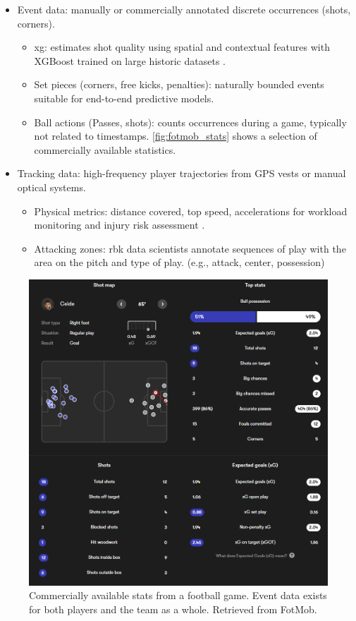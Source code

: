 \begin{itemize}
    \item Event data: manually or commercially annotated discrete occurrences (shots, corners).
    \begin{itemize}
        \item \acrfull{xg}: estimates shot quality using spatial and contextual features with XGBoost trained on large historic datasets \cite{mead_xg_2023}.
        \item Set pieces (corners, free kicks, penalties): naturally bounded events suitable for end-to-end predictive models.
        \item Ball actions (Passes, shots): counts occurrences during a game, typically not related to timestamps. \autoref{fig:fotmob_stats} shows a selection of commercially available statistics. 
    \end{itemize}
    \item Tracking data: high-frequency player trajectories from GPS vests or manual optical systems.
    \begin{itemize}
        \item Physical metrics: distance covered, top speed, accelerations for workload monitoring and injury risk assessment \cite{hennessy_gps_tracker_2018}.
        \item Attacking zones: \acrfull{rbk} data scientists annotate sequences of play with the area on the pitch and type of play. (e.g., attack, center, possession)
    \end{itemize}
\end{itemize}

\begin{figure}[h]
    \centering
    \includegraphics[width=\linewidth]{figures/fotmob_rbk.png}
    \caption{Commercially available stats from a football game. Event data exists for both players and the team as a whole. Retrieved from FotMob\cite{fotmob_game}.}
    \label{fig:fotmob_stats}
\end{figure}

